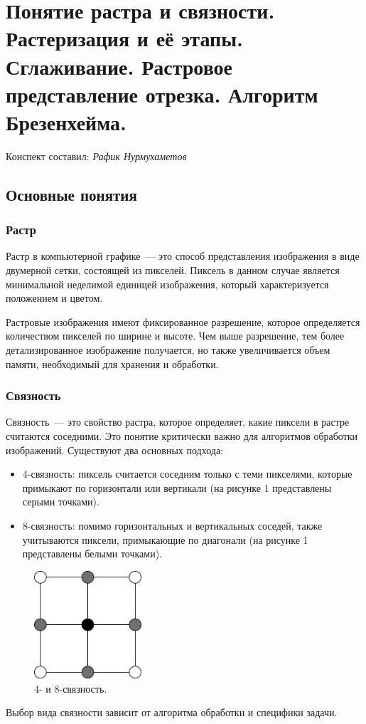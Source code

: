 \section{Понятие растра и связности. Растеризация и её этапы. Сглаживание. Растровое представление отрезка. Алгоритм Брезенхейма.}
\begin{center}
    Конспект составил: \textit{Рафик Нурмухаметов}
\end{center}

\subsection{Основные понятия}
\subsubsection*{Растр}
Растр в компьютерной графике~--- это способ представления изображения в виде двумерной сетки, состоящей из пикселей. Пиксель в данном случае является минимальной неделимой единицей изображения, который характеризуется положением и цветом.

Растровые изображения имеют фиксированное разрешение, которое определяется количеством пикселей по ширине и высоте. Чем выше разрешение, тем более детализированное изображение получается, но также увеличивается объем памяти, необходимый для хранения и обработки.
\subsubsection*{Связность}
Связность~--- это свойство растра, которое определяет, какие пиксели в растре считаются соседними. Это понятие критически важно для алгоритмов обработки изображений. Существуют два основных подхода:
\begin{itemize}
    \item 4-связность: пиксель считается соседним только с теми пикселями, которые примыкают по горизонтали или вертикали (на рисунке 1 представлены серыми точками).
    \item 8-связность: помимо горизонтальных и вертикальных соседей, также учитываются пиксели, примыкающие по диагонали (на рисунке 1 представлены белыми точками).
\end{itemize}

\begin{figure}[H]
    \centering
    \includegraphics[width = 4cm]{cohesion.jpg}
    \caption{4- и 8-связность.}
    \label{fig:float}
\end{figure}
Выбор вида связности зависит от алгоритма обработки и специфики задачи.

